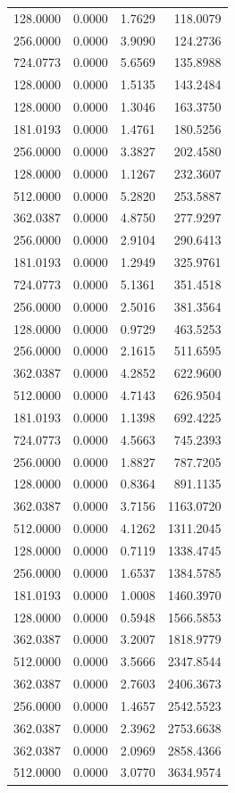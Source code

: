 \begin{tabular}{rrrr}
128.0000 & 0.0000 & 1.7629 & 118.0079 \\
256.0000 & 0.0000 & 3.9090 & 124.2736 \\
724.0773 & 0.0000 & 5.6569 & 135.8988 \\
128.0000 & 0.0000 & 1.5135 & 143.2484 \\
128.0000 & 0.0000 & 1.3046 & 163.3750 \\
181.0193 & 0.0000 & 1.4761 & 180.5256 \\
256.0000 & 0.0000 & 3.3827 & 202.4580 \\
128.0000 & 0.0000 & 1.1267 & 232.3607 \\
512.0000 & 0.0000 & 5.2820 & 253.5887 \\
362.0387 & 0.0000 & 4.8750 & 277.9297 \\
256.0000 & 0.0000 & 2.9104 & 290.6413 \\
181.0193 & 0.0000 & 1.2949 & 325.9761 \\
724.0773 & 0.0000 & 5.1361 & 351.4518 \\
256.0000 & 0.0000 & 2.5016 & 381.3564 \\
128.0000 & 0.0000 & 0.9729 & 463.5253 \\
256.0000 & 0.0000 & 2.1615 & 511.6595 \\
362.0387 & 0.0000 & 4.2852 & 622.9600 \\
512.0000 & 0.0000 & 4.7143 & 626.9504 \\
181.0193 & 0.0000 & 1.1398 & 692.4225 \\
724.0773 & 0.0000 & 4.5663 & 745.2393 \\
256.0000 & 0.0000 & 1.8827 & 787.7205 \\
128.0000 & 0.0000 & 0.8364 & 891.1135 \\
362.0387 & 0.0000 & 3.7156 & 1163.0720 \\
512.0000 & 0.0000 & 4.1262 & 1311.2045 \\
128.0000 & 0.0000 & 0.7119 & 1338.4745 \\
256.0000 & 0.0000 & 1.6537 & 1384.5785 \\
181.0193 & 0.0000 & 1.0008 & 1460.3970 \\
128.0000 & 0.0000 & 0.5948 & 1566.5853 \\
362.0387 & 0.0000 & 3.2007 & 1818.9779 \\
512.0000 & 0.0000 & 3.5666 & 2347.8544 \\
362.0387 & 0.0000 & 2.7603 & 2406.3673 \\
256.0000 & 0.0000 & 1.4657 & 2542.5523 \\
362.0387 & 0.0000 & 2.3962 & 2753.6638 \\
362.0387 & 0.0000 & 2.0969 & 2858.4366 \\
512.0000 & 0.0000 & 3.0770 & 3634.9574 \\
\bottomrule
\end{tabular}
